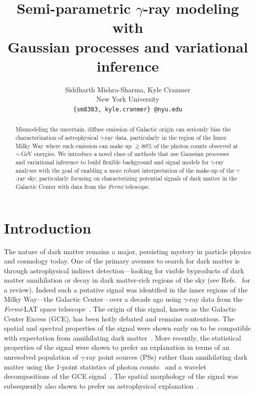 \documentclass[]{article}
\title{Semi-parametric $\gamma$-ray modeling with \\ Gaussian processes and variational inference}
\author{%
  Siddharth Mishra-Sharma, Kyle Cranmer\\
  New York University \\
  \texttt{\{sm8383,\,kyle.cranmer\}\,@nyu.edu} \\
}
\begin{document}
\maketitle

\begin{abstract}
  Mismodeling the uncertain, diffuse emission of Galactic origin can seriously bias the characterization of astrophysical $\gamma$-ray data, particularly in the region of the Inner Milky Way where such emission can make up $\gtrsim80\%$ of the photon counts observed at $\sim$\,GeV energies. We introduce a novel class of methods that use Gaussian processes and variational inference to build flexible background and signal models for $\gamma$-ray analyses with the goal of enabling a more robust interpretation of the make-up of the $\gamma$-ray sky, particularly focusing on characterizing potential signals of dark matter in the Galactic Center with data from the \emph{Fermi} telescope.
\end{abstract}

\section{Introduction}
\label{sec:intro}

The nature of dark matter remains a major, persisting mystery in particle physics and cosmology today. One of the primary avenues to search for dark matter is through astrophysical indirect detection---looking for visible byproducts of dark matter annihilation or decay in dark matter-rich regions of the sky (see Refs.~\cite{Slatyer:2017sev,Lisanti:2016jxe} for a review). Indeed such a putative signal was identified in the inner regions of the Milky Way---the Galactic Center---over a decade ago using $\gamma$-ray data from the \emph{Fermi}-LAT space telescope~\cite{Goodenough:2009gk}. The origin of this signal, known as the Galactic Center Excess (GCE), has been hotly debated and remains contentious. The spatial and spectral properties of the signal were shown early on to be compatible with expectation from annihilating dark matter~\cite{Hooper:2010mq,Daylan:2014rsa}. More recently, the statistical properties of the signal were shown to prefer an explanation in terms of an unresolved population of $\gamma$-ray point sources (PSs) rather than annihilating dark matter using the 1-point statistics of photon counts~\cite{Lee:2015fea} and a wavelet decompositions of the GCE signal~\cite{Bartels:2015aea}. The spatial morphology of the signal was subsequently also shown to prefer an astrophysical explanation~\cite{Macias:2016nev,Macias:2019omb,Bartels:2017vsx}.
\end{document}
